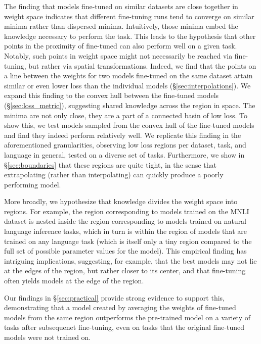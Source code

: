 \documentclass[nohyperref]{article}
\theoremstyle{plain}
\theoremstyle{definition}
\theoremstyle{remark}
\begin{document}
The finding that models fine-tuned on similar datasets are close together in weight space indicates that different fine-tuning runs tend to converge on similar minima rather than dispersed minima. Intuitively, those minima embed the knowledge necessary to perform the task. %
This leads to the hypothesis that other points in the proximity of fine-tuned can also perform well on a given task. Notably, such points in weight space might not necessarily be reached via fine-tuning, but rather via spatial transformations. Indeed, we find that the points on a line between the weights for two models fine-tuned on the same dataset attain similar or even lower loss than the individual models (\S\ref{sec:interpolations}). We expand this finding to the convex hull between the fine-tuned models (\S\ref{sec:loss_metric}), suggesting shared knowledge across the region in space. The minima are not only close, they are a part of a connected basin of low loss. To show this, we test models sampled from the convex hull of the fine-tuned models and find they indeed perform relatively well. We replicate this finding in the aforementioned granularities, observing low loss regions per dataset, task, and language in general, tested on a diverse set of tasks. Furthermore, we show in \S\ref{sec:boundaries} that these regions are quite tight, in the sense that extrapolating (rather than interpolating) can quickly produce a poorly performing model.%

More broadly, we hypothesize that knowledge divides the weight space into regions. For example, the region corresponding to models trained on the MNLI dataset \citep{williams2018broad} is nested inside the region corresponding to models trained on natural language inference tasks, which in turn is within the region of models that are trained on any language task (which is itself only a tiny region compared to the full set of possible parameter values for the model). This empirical finding has intriguing implications, suggesting, for example, that the best models may not lie at the edges of the region, but rather closer to its center, and that fine-tuning often yields models at the edge of the region. 

Our findings in \S\ref{sec:practical} provide strong evidence to support this, demonstrating that a model created by averaging the weights of fine-tuned models from the same region outperforms the pre-trained model on a variety of tasks after subsequenet fine-tuning, even on tasks that the original fine-tuned models were not trained on.
\end{document}
